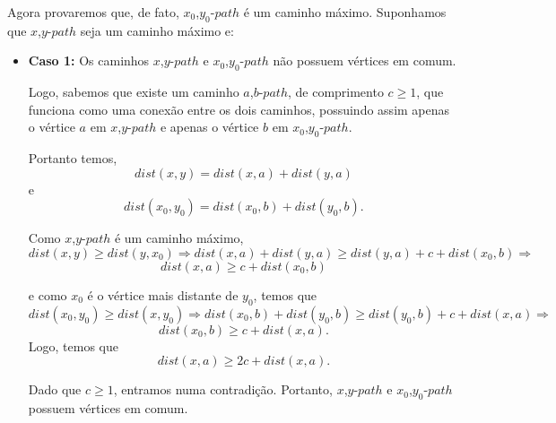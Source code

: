 \documentclass[a4paper,12pt]{article}
\begin{document}
	Agora provaremos que, de fato, $x_0$,$y_0$-$path$ é um caminho 
	máximo.
	Suponhamos que $x$,$y$-$path$ seja um caminho máximo e:

	\begin{itemize}
        \item \textbf{Caso 1:} Os caminhos $x$,$y$-$path$ e 
        $x_0$,$y_0$-$path$ não possuem vértices em comum.

        Logo, sabemos que existe um caminho $a$,$b$-$path$, de 
        comprimento $c \ge 1$, que funciona como uma conexão entre 
        os dois caminhos, possuindo assim apenas o vértice $a$ em 
        $x$,$y$-$path$ e apenas o vértice $b$ em
        $x_0$,$y_0$-$path$.

        Portanto temos,
        $$ dist(x,y) = dist(x,a) + dist(y,a) $$ e
        $$ dist(x_0,y_0) = dist(x_0,b) + dist(y_0,b).$$

        Como $x$,$y$-$path$ é um caminho máximo,
        $$ dist(x,y)\ge dist(y,x_0) \Rightarrow 
        dist(x,a)+dist(y,a)\ge dist(y,a)+c+dist(x_0,b)
        \Rightarrow$$
        $$ dist(x,a)\ge c+dist(x_0,b) $$

        e como $x_0$ é o vértice mais distante de $y_0$, temos que 
        $$ dist(x_0,y_0)\ge dist(x,y_0) \Rightarrow  
        dist(x_0,b) + dist(y_0,b)\ge dist(y_0,b) + c + 
        dist(x,a) \Rightarrow $$
        $$ dist(x_0,b)\ge c + dist(x,a). $$ 
        Logo, temos que
        $$ dist(x,a)\ge 2c + dist(x, a). $$

        Dado que $c\ge 1$, entramos numa contradição. 
        Portanto, $x$,$y$-$path$ e $x_0$,$y_0$-$path$
        possuem vértices em comum.


		\bigskip
		\bigskip
		\bigskip


\end{itemize}
\end{document}

